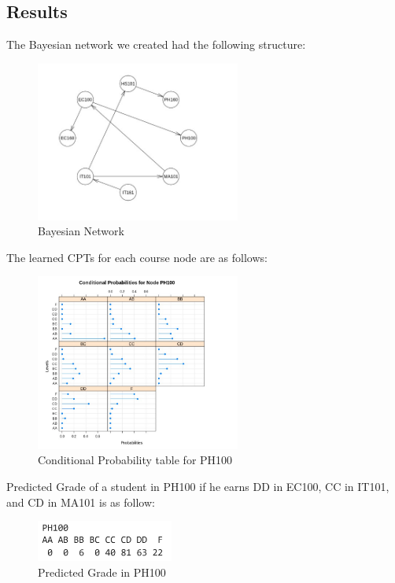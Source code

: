 \documentclass[15pt,journal]{IEEEtran}
\begin{document}
\subsection{Results}
The Bayesian network we created had the following structure:
\begin{figure}[H]%
\begin {center}
\includegraphics[width=0.6\textwidth]{image/Bayesian_network.jpg}
\caption{Bayesian Network} %
\label{fig:ecg}
\end {center}
\end{figure}
The learned CPTs for each course node are as follows:
\begin{figure}[H]%
\begin {center}
\includegraphics[width=0.6\textwidth]{image/CPT_for_PH100.jpg}
\caption{Conditional Probability table for PH100} %
\label{fig:ecg}
\end {center}
\end{figure}
Predicted Grade of a student in PH100 if he earns DD in EC100, CC in IT101, and CD in MA101 is as follow:
\begin{figure}[H]%
\begin {center}
\includegraphics[width=0.4\textwidth]{image/Student_PH100_grade.jpg}
\caption{Predicted Grade in PH100} %
\label{fig:ecg}
\end {center}
\end{figure}
\end{document}
